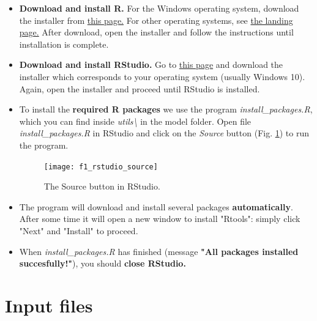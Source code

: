 \documentclass[15pt]{extarticle}
\begin{document}
\begin{itemize}
    \item \textbf{Download and install R.} For the Windows operating system, download the installer from \href{https://cran.rstudio.com/bin/windows/base/}{this page.} For other operating systems, see \href{https://cran.rstudio.com/}{the landing page.} After download, open the installer and follow the instructions until installation is complete.
    \item \textbf{Download and install RStudio.} Go to \href{https://www.rstudio.com/products/rstudio/download/#download}{this page} and download the installer which corresponds to your operating system (usually Windows 10). Again, open the installer and proceed until RStudio is installed.
    \item To install the \textbf{required R packages} we use the program \textit{install\_packages.R}, which you can find inside \textit{utils\textbackslash} in the model folder. Open file \textit{install\_packages.R} in RStudio and click on the \textit{Source} button (Fig. \ref{fig:f1_rstudio_source}) to run the program.
    
\begin{figure}[h]
    \centering
    \texttt{[image: f1\_rstudio\_source]}
    \caption{The Source button in RStudio.}
    \label{fig:f1_rstudio_source}
\end{figure}
    
    \item The program will download and install several packages \textbf{automatically}. After some time it will open a new window to install "Rtools": simply click "Next" and "Install" to proceed.
    \item When \textit{install\_packages.R} has finished (message \textbf{"All packages installed succesfully!"}), you should \textbf{close RStudio.}
\end{itemize}


\section{Input files}
\end{document}
